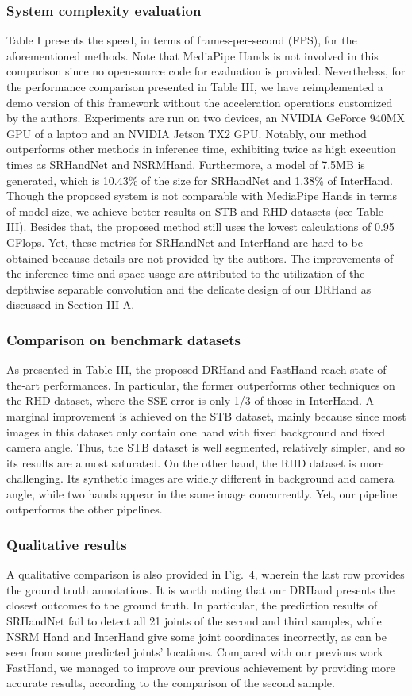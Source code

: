 \documentclass[11pt]{article}
\begin{document}
\subsubsection{System complexity evaluation}
Table I presents the speed, in terms of frames-per-second (FPS), for the aforementioned methods. Note that MediaPipe Hands is not involved in this comparison since no open-source code for evaluation is provided. Nevertheless, for the performance comparison presented in Table III, we have reimplemented a demo version of this framework without the acceleration operations customized by the authors. Experiments are run on two devices, an NVIDIA GeForce 940MX GPU of a laptop and an NVIDIA Jetson TX2 GPU. Notably, our method outperforms other methods in inference time, exhibiting twice as high execution times as SRHandNet and NSRMHand. Furthermore, a model of 7.5MB is generated, which is 10.43\% of the size for SRHandNet and 1.38\% of InterHand. Though the proposed system is not comparable with MediaPipe Hands in terms of model size, we achieve better results on STB and RHD datasets (see Table III). Besides that, the proposed method still uses the lowest calculations of 0.95 GFlops. Yet, these metrics for SRHandNet and InterHand are hard to be obtained because details are not provided by the authors. The improvements of the inference time and space usage are attributed to the utilization of the depthwise separable convolution and the delicate design of our DRHand as discussed in Section III-A.

\subsubsection{Comparison on benchmark datasets}
As presented in Table III, the proposed DRHand and FastHand reach state-of-the-art performances. In particular, the former outperforms other techniques on the RHD dataset, where the SSE error is only 1/3 of those in InterHand. A marginal improvement is achieved on the STB dataset, mainly because since most images in this dataset only contain one hand with fixed background and fixed camera angle. Thus, the STB dataset is well segmented, relatively simpler, and so its results are almost saturated. On the other hand, the RHD dataset is more challenging. Its synthetic images are widely different in background and camera angle, while two hands appear in the same image concurrently. Yet, our pipeline outperforms the other pipelines.

\subsubsection{Qualitative results}
A qualitative comparison is also provided in Fig.\ 4, wherein the last row provides the ground truth annotations. It is worth noting that our DRHand presents the closest outcomes to the ground truth. In particular, the prediction results of SRHandNet fail to detect all 21 joints of the second and third samples, while NSRM Hand and InterHand give some joint coordinates incorrectly, as can be seen from some predicted joints’ locations. Compared with our previous work FastHand, we managed to improve our previous achievement by providing more accurate results, according to the comparison of the second sample.
\end{document}
